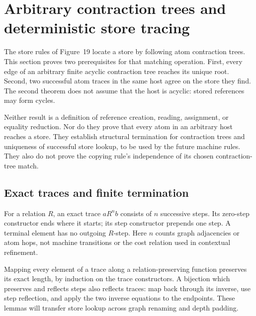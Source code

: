 \clearpage
\section{Arbitrary contraction trees and deterministic store tracing}
\label{sec:copying-tracing}
The store rules of Figure~19 locate a store by following atom contraction
trees. This section proves two prerequisites for that matching operation.
First, every edge of an arbitrary finite acyclic contraction tree reaches
its unique root. Second, two successful atom traces in the same host agree
on the store they find. The second theorem does not assume that the host
is acyclic: stored references may form cycles.

Neither result is a definition of reference creation, reading, assignment,
or equality reduction. Nor do they prove that every atom in an arbitrary
host reaches a store. They establish structural termination for contraction
trees and uniqueness of successful store lookup, to be used by the future
machine rules. They also do not prove the copying rule's independence of
its chosen contraction-tree match.

\subsection{Exact traces and finite termination}
For a relation $R$, an exact trace $a\mathrel{R^n}b$ consists of $n$ successive
steps. Its zero-step constructor ends where it starts; its step constructor
prepends one step. A terminal element has no outgoing $R$-step. Here $n$
counts graph adjacencies or atom hops, not machine transitions or the cost
relation used in contextual refinement.

Mapping every element of a trace along a relation-preserving function
preserves its exact length, by induction on the trace constructors. A
bijection which preserves and reflects steps also reflects traces: map
back through its inverse, use step reflection, and apply the two inverse
equations to the endpoints. These lemmas will transfer store lookup across
graph renaming and depth padding.





